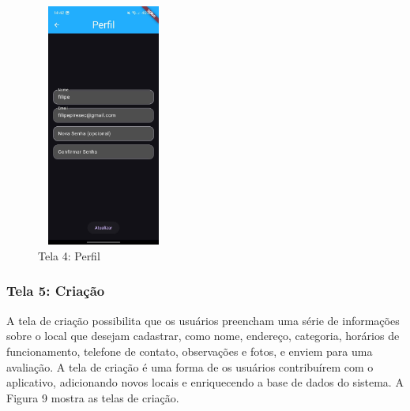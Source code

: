     \begin{figure}[h]
        \centering
        \includegraphics[width=44mm,height=80mm]{imagens/perfil.jpg}
        \caption{\scriptsize Tela 4: Perfil}
        \label{fig:tela4}
    \end{figure}

    \FloatBarrier

\subsubsection{Tela 5: Criação}

    A tela de criação possibilita que os usuários preencham uma série de informações sobre o local que desejam cadastrar, como nome, endereço, categoria, horários de funcionamento, telefone de contato, observações e fotos, e enviem para uma avaliação. A tela de criação é uma forma de os usuários contribuírem com o aplicativo, adicionando novos locais e enriquecendo a base de dados do sistema. A Figura 9 mostra as telas de criação.

